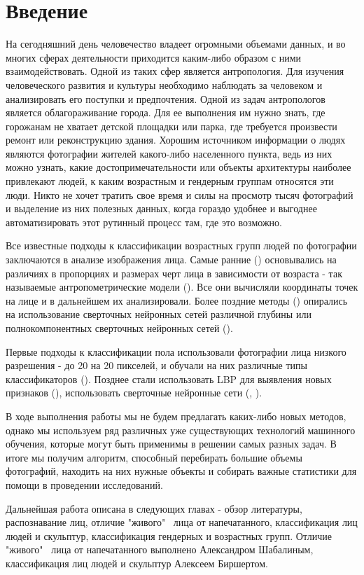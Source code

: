 \documentclass[a4paper,14pt]{extarticle}
\begin{document}
    \section{Введение}

    \par На сегодняшний день человечество владеет огромными объемами данных, и во многих сферах деятельности приходится каким-либо образом с ними взаимодействовать. Одной из таких сфер является антропология. Для изучения человеческого развития и культуры необходимо наблюдать за человеком и анализировать его поступки и предпочтения. Одной из задач антропологов является облагораживание города. Для ее выполнения им нужно знать, где горожанам не хватает детской площадки или парка, где требуется произвести ремонт или реконструкцию здания. Хорошим источником информации о людях являются фотографии жителей какого-либо населенного пункта, ведь из них можно узнать, какие достопримечательности или объекты архитектуры наиболее привлекают людей, к каким возрастным и гендерным группам относятся эти люди. Никто не хочет тратить свое время и силы на просмотр тысяч фотографий и выделение из них полезных данных, когда гораздо удобнее и выгоднее автоматизировать этот рутинный процесс там, где это возможно.
    \par Все известные подходы к классификации возрастных групп людей по фотографии заключаются в анализе изображения лица. Самые ранние (\cite{age1994}) основывались на различиях в пропорциях и размерах черт лица в зависимости от возраста - так называемые антропометрические модели (\cite{unfiltered}). Все они вычисляли координаты точек на лице и в дальнейшем их анализировали. Более поздние методы (\cite{hassner}) опирались на использование сверточных нейронных сетей различной глубины или полнокомпонентных сверточных нейронных сетей (\cite{INDIA}).
    \par Первые подходы к классификации пола использовали фотографии лица низкого разрешения - до 20 на 20 пикселей, и обучали на них различные типы классификаторов (\cite{smoll}). Позднее стали использовать LBP для выявления новых признаков (\cite{lbp_age}), использовать сверточные нейронные сети (\cite{hassner}, \cite{INDIA}).
    \par В ходе выполнения работы мы не будем предлагать каких-либо новых методов, однако мы используем ряд различных уже существующих технологий машинного обучения, которые могут быть применимы в решении самых разных задач. В итоге мы получим алгоритм, способный перебирать большие объемы фотографий, находить на них нужные объекты и собирать важные статистики для помощи в проведении исследований.
    \par Дальнейшая работа описана в следующих главах - обзор литературы, распознавание лиц, отличие "живого" \, лица от напечатанного, классификация лиц людей и скульптур, классификация гендерных и возрастных групп. Отличие "живого" \, лица от напечатанного выполнено Александром Шабалиным, классификация лиц людей и скульптур Алексеем Биршертом.
    \newpage
\end{document}
